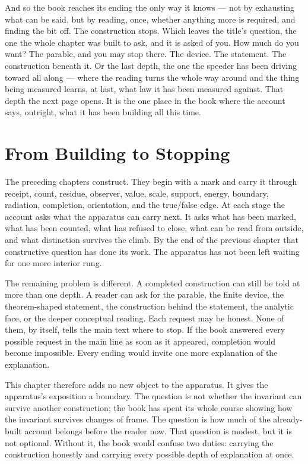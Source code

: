 And so the book reaches its ending the only way it knows --- not by exhausting what can be said, but by reading, once, whether anything more is required, and finding the bit off. The construction stops. Which leaves the title's question, the one the whole chapter was built to ask, and it is asked of you. How much do you want? The parable, and you may stop there. The device. The statement. The construction beneath it. Or the last depth, the one the speeder has been driving toward all along --- where the reading turns the whole way around and the thing being measured learns, at last, what law it has been measured against. That depth the next page opens. It is the one place in the book where the account says, outright, what it has been building all this time.

\section{From Building to Stopping}

The preceding chapters construct. They begin with a mark and carry it through
receipt, count, residue, observer, value, scale, support, energy, boundary,
radiation, completion, orientation, and the true/false edge. At each stage the
account asks what the apparatus can carry next. It asks what has been marked,
what has been counted, what has refused to close, what can be read from outside,
and what distinction survives the climb. By the end of the previous chapter
that constructive question has done its work. The apparatus has not been left
waiting for one more interior rung.

The remaining problem is different. A completed construction can still be told
at more than one depth. A reader can ask for the parable, the finite device, the
theorem-shaped statement, the construction behind the statement, the analytic
face, or the deeper conceptual reading. Each request may be honest. None of
them, by itself, tells the main text where to stop. If the book answered every
possible request in the main line as soon as it appeared, completion would
become impossible. Every ending would invite one more explanation of the
explanation.

This chapter therefore adds no new object to the apparatus. It gives the
apparatus's exposition a boundary. The question is not whether the invariant can
survive another construction; the book has spent its whole course showing how
the invariant survives changes of frame. The question is how much of the
already-built account belongs before the reader now. That question is modest,
but it is not optional. Without it, the book would confuse two duties: carrying
the construction honestly and carrying every possible depth of explanation at
once.

